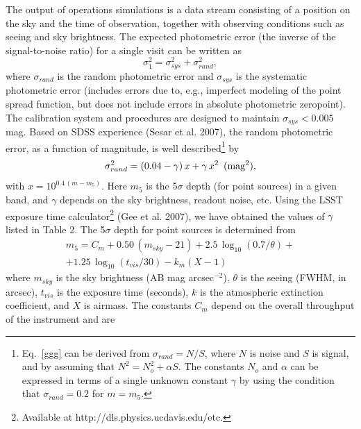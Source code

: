 \documentclass{emulateapj}
\begin{document}
The output of operations simulations is a data stream consisting of 
a position on the sky and the time of observation, together with 
observing conditions such as seeing and sky brightness. The expected 
photometric error (the inverse of the signal-to-noise ratio) for a single visit
can be written as
\begin{equation}
         \sigma_1^2 = \sigma_{sys}^2 + \sigma_{rand}^2,
\end{equation}
where $\sigma_{rand}$ is the random photometric error and $\sigma_{sys}$ is 
the systematic photometric error (includes errors due to, e.g., imperfect
modeling of the point spread function, but does not include errors in 
absolute photometric zeropoint). The calibration system and procedures
are designed to maintain $\sigma_{sys}<0.005$ mag. Based on 
SDSS experience (Sesar et al. 2007), the random photometric error, as
a function of magnitude, is well described\footnote{Eq.~\ref{ggg} can 
be derived from $\sigma_{rand}=N/S$, where $N$ is noise and $S$ is signal, 
and by assuming that $N^2 = N_o^2 + \alpha S$. The constants $N_o$ and 
$\alpha$ can be expressed in terms of a single unknown constant $\gamma$ 
by using the condition that $\sigma_{rand}=0.2$ for $m=m_5$.} by
\begin{equation}
\label{ggg}
  \sigma_{rand}^2 = (0.04-\gamma)\, x + \gamma \, x^2 \,\,\, {\rm (mag^2),}
\end{equation}
with $x = 10^{0.4\,(m-m_5)}$. Here $m_5$ is the 5$\sigma$ depth (for
point sources) in a given band, and $\gamma$ depends on the sky 
brightness, readout noise, etc. Using the LSST exposure time 
calculator\footnote{Available at http://dls.physics.ucdavis.edu/etc.} 
(Gee et al. 2007), we have obtained the values of $\gamma$ 
listed in Table 2. The 5$\sigma$ depth for point sources is determined from 
\begin{eqnarray}
\label{m5}
  m_5 = C_m + 0.50\,(m_{sky}-21) + 2.5\,\log_{10}(0.7/\theta) +  \nonumber \\
        + 1.25\,\log_{10}(t_{vis}/30) - k_m(X-1) \phantom{xxxxx}
\end{eqnarray}
where $m_{sky}$ is the sky brightness (AB mag arcsec$^{-2}$), $\theta$ is 
the seeing (FWHM, in arcsec), $t_{vis}$ is the exposure time (seconds),
$k$ is the atmospheric extinction coefficient, and $X$ is airmass. 
The constants $C_m$ depend on the overall throughput of the instrument
and are 
\end{document}
